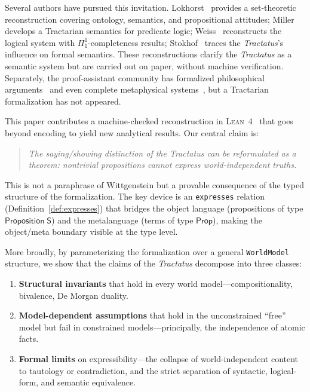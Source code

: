 \documentclass[10pt, letterpaper]{article}
\theoremstyle{definition}
\theoremstyle{remark}
\newcommand{\Sach}{\mathsf{S}}
\newcommand{\Prop}{\mathsf{Prop}}
\newcommand{\Lean}{\textsc{Lean}}
\begin{document}
Several authors have pursued this invitation.
Lokhorst~\cite{lokhorst1988} provides a set-theoretic
reconstruction covering ontology, semantics, and propositional
attitudes;
Miller~\cite{miller1995} develops a Tractarian semantics for
predicate logic;
Weiss~\cite{weiss2017} reconstructs the logical system with
$\Pi^1_1$-completeness results;
Stokhof~\cite{stokhof2008} traces the \emph{Tractatus}'s
influence on formal semantics.
These reconstructions clarify the \emph{Tractatus} as a semantic
system but are carried out on paper, without machine verification.
Separately, the proof-assistant community has formalized
philosophical arguments~\cite{benzmuller2017,fitelson2007} and
even complete metaphysical systems~\cite{scherf2025}, but a
Tractarian formalization has not appeared.

This paper contributes a machine-checked reconstruction in
\Lean~4~\cite{moura2021} that goes beyond encoding to yield new
analytical results.  Our central claim is:

\begin{quote}
\emph{The saying/showing distinction of the \emph{Tractatus} can
be reformulated as a theorem: nontrivial propositions cannot
express world-independent truths.}
\end{quote}

\noindent
This is not a paraphrase of Wittgenstein but a provable
consequence of the typed structure of the formalization.
The key device is an \texttt{expresses} relation (Definition~\ref{def:expresses})
that bridges the object language (propositions of type
$\mathsf{Proposition}\;\Sach$) and the metalanguage (terms of
type $\Prop$), making the object/meta boundary visible at the
type level.

More broadly, by parameterizing the formalization over a general
\texttt{WorldModel} structure, we show that the claims of the
\emph{Tractatus} decompose into three classes:
\begin{enumerate}[nosep]
  \item \textbf{Structural invariants} that hold in every world
    model---compositionality, bivalence, De Morgan duality.
  \item \textbf{Model-dependent assumptions} that hold in the
    unconstrained ``free'' model but fail in constrained
    models---principally, the independence of atomic facts.
  \item \textbf{Formal limits} on expressibility---the collapse
    of world-independent content to tautology or contradiction,
    and the strict separation of syntactic, logical-form, and
    semantic equivalence.
\end{enumerate}
\end{document}
